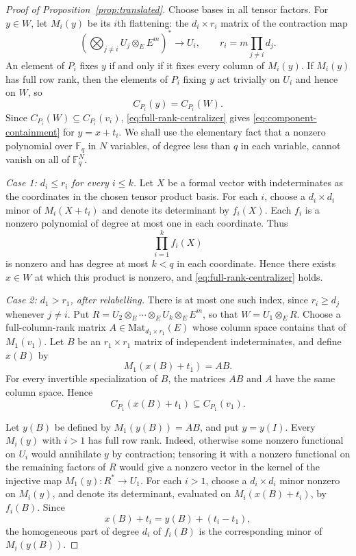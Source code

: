 \documentclass[10pt,a4paper]{amsart}
\theoremstyle{plain}
\theoremstyle{definition}
\theoremstyle{remark}
\begin{document}
\begin{proof}[Proof of Proposition~\ref{prop:translated}]
Choose bases in all tensor factors.
For $y \in W$, let $M_i(y)$ be its $i$th flattening:
the $d_i\times r_i$ matrix of the contraction map
\[
    \left(\bigotimes_{j\ne i}U_j\otimes_E E^m\right)^*
    \to U_i,
    \qquad
    r_i=m\prod_{j\ne i}d_j.
\]
An element of \(P_i\) fixes \(y\) if and only if it fixes every column of \(M_i(y)\). If \(M_i(y)\) has full row rank, then the elements of \(P_i\) fixing $y$ act trivially on \(U_i\) and hence on \(W\), so
\begin{equation}\label{eq:full-rank-centralizer}
    C_{P_i}(y) = C_{P_i}(W) .
\end{equation}
Since \(C_{P_i}(W)\subseteq C_{P_i}(v_i)\), \eqref{eq:full-rank-centralizer} gives \eqref{eq:component-containment} for $y = x +t_i$.
We shall use the elementary fact that a nonzero polynomial over $\mathbb{F}_q$ in $N$ variables, of degree less than $q$ in each variable, cannot vanish on all of $\mathbb{F}_q^N$.

\smallskip
\noindent\emph{Case 1: $d_i \leqslant r_i$ for every $i \leqslant k$.}
Let $X$ be a formal vector with indeterminates as the coordinates in the chosen tensor product basis.
For each $i$, choose a $d_i \times d_i$ minor of $M_i(X+t_i)$ and denote its determinant by $f_i(X)$.
Each $f_i$ is a nonzero polynomial of degree at most one in each coordinate.
Thus
\[
    \prod_{i=1}^k f_i(X)
\]
is nonzero and has degree at most $k<q$ in each coordinate.
Hence there exists $x\in W$ at which this product is nonzero,
and \eqref{eq:full-rank-centralizer} holds.

\smallskip
\noindent\emph{Case 2: $d_1>r_1$, after relabelling.}
There is at most one such index, since $r_i \geqslant d_j$ whenever $j\ne i$.
Put $R=U_2\otimes_E\cdots\otimes_E U_k\otimes_E E^m$, so that $W=U_1\otimes_E R$.
Choose a full-column-rank matrix
$A\in\mathrm{Mat}_{d_1\times r_1}(E)$ whose column space contains that of
$M_1(v_1)$. Let $B$ be an $r_1\times r_1$ matrix of independent
indeterminates, and define $x(B)$ by
\[
    M_1(x(B)+t_1)=AB.
\]
For every invertible specialization of $B$, the matrices $AB$ and
$A$ have the same column space. Hence
\begin{equation}\label{eq:first-factor}
    C_{P_1}(x(B)+t_1) \subseteq C_{P_1}(v_1).
\end{equation}

Let $y(B)$ be defined by $M_1(y(B))=AB$, and put $y=y(I)$.
Every $M_i(y)$ with $i>1$ has full row rank.
Indeed, otherwise some nonzero functional on $U_i$ would annihilate $y$ by contraction;
tensoring it with a nonzero functional on the remaining factors of $R$
would give a nonzero vector in the kernel
of the injective map $M_1(y) \colon R^* \to U_1$.
For each $i>1$, choose a $d_i\times d_i$ minor nonzero on $M_i(y)$,
and denote its determinant, evaluated on $M_i(x(B)+t_i)$, by $f_i(B)$.
Since
\[
    x(B)+t_i=y(B)+(t_i-t_1),
\]
the homogeneous part of degree $d_i$ of $f_i(B)$ is the corresponding minor of $M_i(y(B))$.


\end{proof}
\end{document}
